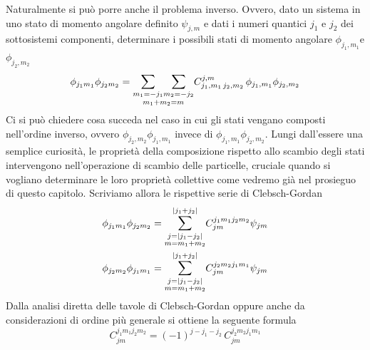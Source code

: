 Naturalmente si può porre anche il problema inverso.
Ovvero, dato un sistema in uno stato di momento angolare definito $\psi_{j,m}$ e dati i numeri quantici $j_{1}$ e $j_{2}$ dei sottosistemi componenti, determinare i possibili stati di momento angolare  $\phi_{j_{1},m_{1}}$e $\phi_{j_{2},m_{2}}$
\begin{equation}
    \phi_{j_{1}m_{1}} \phi_{j_{2}m_{2}} =  \underset{m_{1}+m_{2}=m}{\mathlarger{\sum}_{m_{1}=-j_{1}} \mathlarger{\sum}_{ m_{2}=-j_{2}}}
    C^{j,m}_{j_{1},m_{1} \, j_{2},m_{2}} \, \phi_{j_{1},m_{1}}\phi_{j_{2},m_{2}}
    \label{eq:inverse-clebsch-gordan}
\end{equation}
Ci si può chiedere cosa succeda nel caso in cui gli stati vengano composti nell’ordine inverso, ovvero $\phi_{j_{2},m_{2}} \phi_{j_{1},m_{1}}$ invece di $\phi_{j_{1},m_{1}}\phi_{j_{2},m_{2}}$.
Lungi dall’essere una semplice curiosità, le proprietà della composizione rispetto allo scambio degli stati intervengono nell’operazione di scambio delle particelle, cruciale quando si vogliano determinare le loro proprietà collettive come vedremo già nel prosieguo di questo capitolo.
Scriviamo allora le rispettive serie di Clebsch-Gordan
\begin{gather*}
    \phi_{j_{1}m_{1}} \phi_{j_{2}m_{2}} = \mathlarger{\sum}_{\substack{j=| j_{1}-j_{2}| \\ m = m_{1}+m_{2}} }^{| j_{1}+j_{2}|} C_{jm}^{j_{1}m_{1}j_{2}m_{2}} \psi_{jm}\\
    \phi_{j_{2}m_{2}} \phi_{j_{1}m_{1}} = \mathlarger{\sum}_{\substack{j=| j_{1}-j_{2}| \\ m = m_{1}+m_{2}} }^{| j_{1}+j_{2}|} C_{jm}^{j_{2}m_{2}j_{1}m_{1}} \psi_{jm}
\end{gather*}
Dalla analisi diretta delle tavole di Clebsch-Gordan oppure anche da considerazioni di ordine più generale si ottiene la seguente formula
\[
    C_{jm}^{j_{1}m_{1}j_{2}m_{2}} = (-1)^{j-j_1-j_2} \, C_{jm}^{j_{2}m_{2}j_{1}m_{1}}
\]
\bigskip

